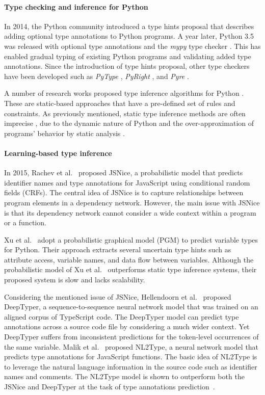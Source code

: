 \paragraph{Type checking  and inference for Python}
In 2014, the Python community introduced a type hints proposal \cite{van2014pep} that describes adding optional type annotations to Python programs. A year later, Python 3.5 was released with optional type annotations and the \textit{mypy} type checker \cite{lehtosalo2017mypy}. This has enabled gradual typing of existing Python programs and validating added type annotations. Since the introduction of type hints proposal, other type checkers have been developed such as \textit{PyType} \cite{pytype}, \textit{PyRight} \cite{pyright}, and \textit{Pyre} \cite{pyre}.

A number of research works proposed type inference algorithms for Python \cite{salib2004faster, maia2012static, hassan2018maxsmt}. These are static-based approaches that have a pre-defined set of rules and constraints. As previously mentioned, static type inference methods are often imprecise \cite{pavlinovic2019leveraging}, due to the dynamic nature of Python and the over-approximation of programs' behavior by static analysis \cite{madsen2015static}.

\paragraph{Learning-based type inference} In 2015, Rachev et al.~\cite{raychev2015predicting} proposed JSNice, a probabilistic model that predicts identifier names and type annotations for JavaScript using conditional random fields (CRFs). The central idea of JSNice is to capture relationships between program elements in a dependency network.
However, the main issue with JSNice is that its dependency network cannot consider a wide context within a program or a function.

Xu et al.~\cite{xu2016python} adopt a probabilistic graphical model (PGM) to predict variable types for Python. Their approach extracts several uncertain type hints such as attribute access, variable names, and data flow between variables. Although the probabilistic model of Xu et al.~\cite{xu2016python} outperforms static type inference systems, their proposed system is slow and lacks scalability.

Considering the mentioned issue of JSNice, Hellendoorn et al.~\cite{hellendoorn2018deep} proposed DeepTyper, a sequence-to-sequence neural network model that was trained on an aligned corpus of TypeScript code. The DeepTyper model can predict type annotations across a source code file by considering a much wider context. Yet DeepTyper suffers from inconsistent predictions for the token-level occurrences of the same variable. Malik et al.~\cite{malik2019nl2type} proposed NL2Type, a neural network model that predicts type annotations for JavaScript functions. The basic idea of NL2Type is to leverage the natural language information in the source code such as identifier names and comments. The NL2Type model is shown to outperform both the JSNice and DeepTyper at the task of type annotations prediction~\cite{malik2019nl2type}.

